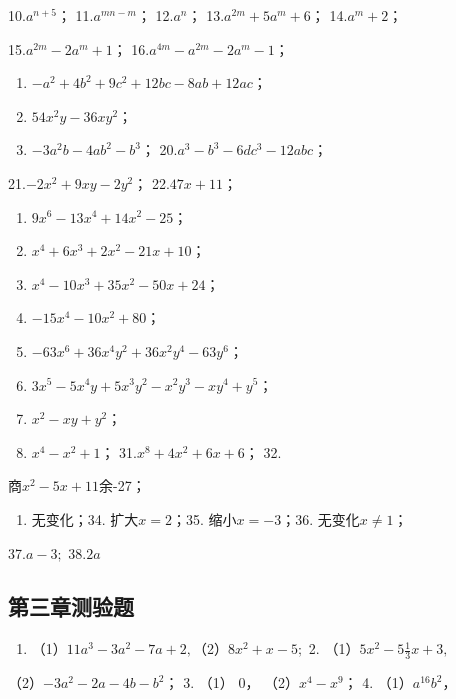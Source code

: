 10.\(a^{n + 5}\)； 11.\(a^{m n - m}\)； 12.\(a^n\)；
13.\(a^{2m} + 5a^{m} + 6\)； 14.\(a^m + 2\)；

15.\(a^{2m} - 2a^m + 1\)； 16.\(a^{4m} - a^{2m} - 2a^m - 1\)；

\begin{enumerate}[start=17]
\item
  \(-a^{2} + 4b^{2} + 9c^{2} + 12bc - 8ab + 12ac\)；
\item
  \(54x^{2}y - 36xy^{2}\)；
\item
  \(-3a^{2}b - 4ab^{2} - b^{3}\)； 20.\(a^3 - b^3 - 6dc^3 - 12abc\)；
\end{enumerate}

21.\(-2x^{2} + 9xy - 2y^{2}\)； 22.\(47x + 11\)；
\begin{enumerate}[start=23]
\item
  \(9x^{6} - 13x^{4} + 14x^{2} - 25\)；
\item
  \(x^{4} + 6x^{3} + 2x^{2} - 21x + 10\)；
\item
  \(x^{4} - 10x^{3} + 35x^{2} - 50x + 24\)；
\item
  \(-15x^{4} - 10x^{2} + 80\)；
\item
  \(-63x^{6} + 36x^{4}y^{2} + 36x^{2}y^{4} - 63y^{6}\)；
\item
  \(3x^{5} - 5x^{4}y + 5x^{3}y^{2} - x^{2}y^{3} - xy^{4} + y^{5}\)；
\item
  \(x^{2} - xy + y^{2}\)；
\item
  \(x^{4} - x^{2} + 1\)； 31.\(x^{8} + 4x^{2} + 6x + 6\)； 32.
\end{enumerate}
商\(x^{2} - 5x + 11\)余-27；

\begin{enumerate}[start=33]
\item
  无变化；34. 扩大\(x = 2\)；35. 缩小\(x = -3\)；36.
  无变化\(x \neq 1\)；
\end{enumerate}

37.\(a - 3;\) 38.\(2a\)

\subsection{第三章测验题}

\begin{enumerate}
\item
  （1）\(11a^{3} - 3a^{2} - 7a + 2,\)（2）\(8x^{2} + x - 5;\) 2.
  （1）\(5x^{2} - 5\frac{1}{3} x + 3,\)
\end{enumerate}

（2）\(-3a^{2} - 2a - 4b - b^{2}\)； 3. （1） 0，
（2）\(x^{4} - x^{9}\)； 4. （1）\(a^{16}b^{2}\)，

